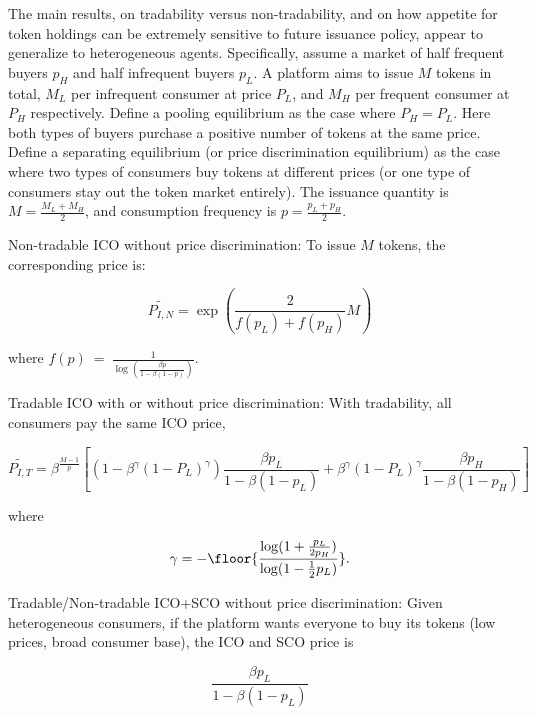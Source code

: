 The main results, on tradability versus non-tradability, and on how appetite for token holdings can be extremely sensitive to future issuance policy, appear to generalize to heterogeneous agents.
Specifically, assume a market of half frequent buyers $p_H$ and half infrequent
buyers $p_L$. A platform aims to issue $M$ tokens in total, $M_L$ per infrequent
consumer at price $P_L$, and $M_H$ per frequent consumer at $P_H$ respectively.
Define a pooling equilibrium  as the case where $P_H = P_L$. Here both types of buyers purchase a positive number of tokens at the same price.  Define a separating equilibrium (or price discrimination equilibrium) as the case where two types of consumers buy tokens at different prices (or one type of consumers stay out the
token market entirely). The issuance quantity is $M=\frac{M_{L}+M_{H}}{2}$, and consumption frequency is $p=\frac{p_{L}+p_{H}}{2}$.

Non-tradable ICO without price discrimination: To issue $M$ tokens, the corresponding price is:

\begin{equation}
    \widetilde{P_{I,N}}=\exp{\left(\frac{2}{f(p_{L})+f(p_{H})} M\right)}
\end{equation}

where $f(p)\ =\ \frac{1}{\log\left(\frac{\beta p}{1-\beta(1-p)}\right)}$.

Tradable ICO with or without price discrimination: With tradability, all consumers pay the same ICO price,

\begin{equation}
    \widetilde{P_{I,T}}=\beta^{\frac{M-1}{p}}\left[(1-\beta^{\gamma}(1-P_{L})^{\gamma})\frac{\beta p_{L}}{1-\beta(1-p_{L})}+\beta^{\gamma}(1-P_{L})^{\gamma}\frac{\beta p_{H}}{1-\beta(1-p_{H})}\right]
\end{equation}

where

\begin{equation}
    \gamma=-\floor{\frac{\log(1+\frac{p_{L}}{2p_{H}})}{\log(1-\frac{1}{2}p_{L})}}.
\end{equation}

Tradable/Non-tradable ICO+SCO without price discrimination: Given heterogeneous consumers, if the platform wants everyone to buy its tokens (low prices, broad consumer base), the ICO and SCO price is 

\begin{equation}
    \frac{\beta p_{L}}{1-\beta(1-p_{L})}
\end{equation}

